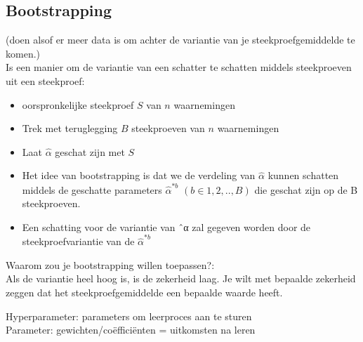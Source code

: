 {\subsection{Bootstrapping} (doen alsof er meer data is om achter de variantie van je steekproefgemiddelde te komen.)\\
Is een manier om de variantie van een schatter te schatten middels steekproeven uit een steekproef:
\begin{itemize}
    \item oorspronkelijke steekproef $S$ van $n$ waarnemingen
    \item Trek met teruglegging $B$ steekproeven van $n$ waarnemingen
    \item Laat $\hat{\alpha}$ geschat zijn met $S$
    \item Het idee van bootstrapping is dat we de verdeling van $\hat{\alpha}$ kunnen schatten middels de geschatte parameters $\hat{\alpha}^{*b}$ $(b \in {1, 2,.., B})$ die geschat zijn op de B steekproeven.
    \item Een schatting voor de variantie van ˆα zal gegeven worden
door de steekproefvariantie van de $\hat{\alpha}^{*b}$
\end{itemize}
Waarom zou je bootstrapping willen toepassen?:\\
Als de variantie heel hoog is, is de zekerheid laag. Je wilt met bepaalde zekerheid zeggen dat het steekproefgemiddelde een bepaalde waarde heeft.

\noindent Hyperparameter: parameters om leerproces aan te sturen\\
Parameter: gewichten/coëfficiënten = uitkomsten na leren\\

}
